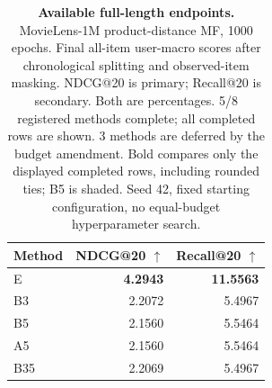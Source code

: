 \begin{table}[!htbp]
\centering
\caption{\textbf{Available full-length endpoints.} MovieLens-1M product-distance MF, 1000 epochs. Final all-item user-macro scores after chronological splitting and observed-item masking. NDCG@20 is primary; Recall@20 is secondary. Both are percentages. 5/8 registered methods complete; all completed rows are shown. 3 methods are deferred by the budget amendment. Bold compares only the displayed completed rows, including rounded ties; B5 is shaded. Seed 42, fixed starting configuration, no equal-budget hyperparameter search.}
\label{tab:revision-recommendation-audit}
\footnotesize\setlength{\tabcolsep}{5pt}\renewcommand{\arraystretch}{1.12}
\begin{tabular}{lrr}
\toprule
Method & NDCG@20 $\uparrow$ & Recall@20 $\uparrow$ \\
\midrule
E & \textbf{4.2943} & \textbf{11.5563} \\
B3 & 2.2072 & 5.4967 \\
\rowcolor{oursbg}
B5 & 2.1560 & 5.5464 \\
A5 & 2.1560 & 5.5464 \\
B35 & 2.2069 & 5.4967 \\
\bottomrule
\end{tabular}
\end{table}
